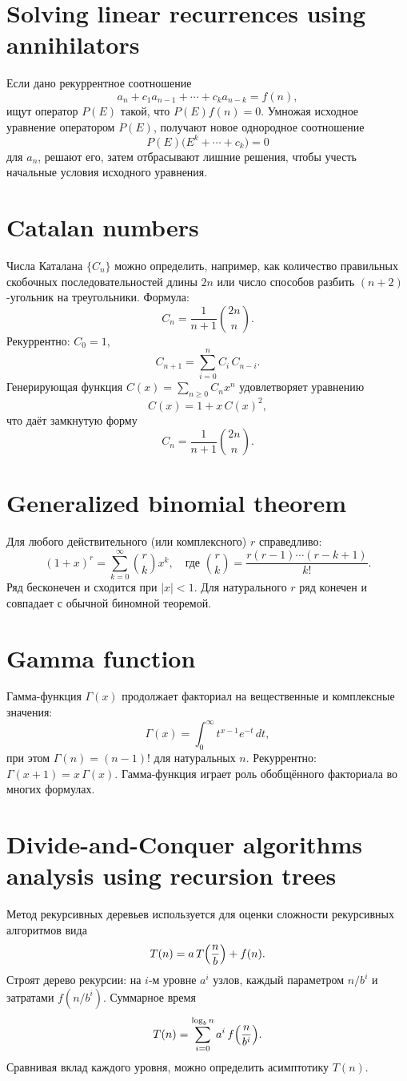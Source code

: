 \documentclass{article}
\begin{document}
	\section{Solving linear recurrences using annihilators}
	Если дано рекуррентное соотношение 
	\[
	a_n + c_1 a_{n-1} + \cdots + c_k a_{n-k} = f(n),
	\]
	ищут оператор $P(E)$ такой, что $P(E)f(n)=0$. Умножая исходное уравнение оператором $P(E)$, получают новое однородное соотношение 
	\[
	P(E)\bigl(E^k + \cdots + c_k\bigr)=0
	\]
	для $a_n$, решают его, затем отбрасывают лишние решения, чтобы учесть начальные условия исходного уравнения.
	
	\section{Catalan numbers}
	Числа Каталана $\{C_n\}$ можно определить, например, как количество правильных скобочных последовательностей длины $2n$ или число способов разбить $(n+2)$-угольник на треугольники. Формула:
	\[
	C_n = \frac{1}{n+1}\binom{2n}{n}.
	\]
	Рекуррентно: $C_0=1$, 
	\[
	C_{n+1} = \sum_{i=0}^n C_i\,C_{n-i}.
	\]
	Генерирующая функция $C(x)=\sum_{n\ge0}C_n x^n$ удовлетворяет уравнению 
	\[
	C(x)=1 + x\,C(x)^2,
	\]
	что даёт замкнутую форму 
	\[
	C_n = \frac{1}{n+1}\binom{2n}{n}.
	\]
	
	\section{Generalized binomial theorem}
	Для любого действительного (или комплексного) $r$ справедливо:
	\[
	(1+x)^r = \sum_{k=0}^\infty \binom{r}{k} x^k, \quad \text{где } \binom{r}{k} = \frac{r(r-1)\cdots(r-k+1)}{k!}.
	\]
	Ряд бесконечен и сходится при $|x|<1$. Для натурального $r$ ряд конечен и совпадает с обычной биномной теоремой.
	
	\section{Gamma function}
	Гамма-функция $\Gamma(x)$ продолжает факториал на вещественные и комплексные значения:
	\[
	\Gamma(x) = \int_0^\infty t^{x-1} e^{-t}\,dt,
	\]
	при этом $\Gamma(n)=(n-1)!$ для натуральных $n$. Рекуррентно: $\Gamma(x+1)=x\,\Gamma(x)$. Гамма-функция играет роль обобщённого факториала во многих формулах.
	
	\section{Divide-and-Conquer algorithms analysis using recursion trees}
	Метод рекурсивных деревьев используется для оценки сложности рекурсивных алгоритмов вида 
	\[
	T(n)=a\,T\Bigl(\frac{n}{b}\Bigr) + f(n).
	\]
	Строят дерево рекурсии: на $i$-м уровне $a^i$ узлов, каждый параметром $n/b^i$ и затратами $f(n/b^i)$. Суммарное время 
	\[
	T(n)=\sum_{i=0}^{\log_b n} a^i\,f\Bigl(\frac{n}{b^i}\Bigr).
	\]
	Сравнивая вклад каждого уровня, можно определить асимптотику $T(n)$.
	
\end{document}
